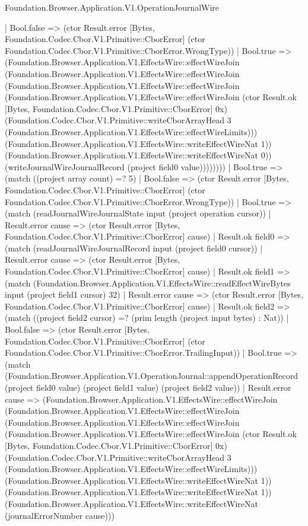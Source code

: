 \begin{lexlean}{Foundation.Browser.Application.V1.OperationJournalWire}
\begin{semanticmodule}
{                        | Bool.false => (ctor Result.error [Bytes, Foundation.Codec.Cbor.V1.Primitive::CborError] (ctor Foundation.Codec.Cbor.V1.Primitive::CborError.WrongType))
                        | Bool.true => (Foundation.Browser.Application.V1.EffectsWire::effectWireJoin (Foundation.Browser.Application.V1.EffectsWire::effectWireJoin (Foundation.Browser.Application.V1.EffectsWire::effectWireJoin (Foundation.Browser.Application.V1.EffectsWire::effectWireJoin (ctor Result.ok [Bytes, Foundation.Codec.Cbor.V1.Primitive::CborError] 0x) (Foundation.Codec.Cbor.V1.Primitive::writeCborArrayHead 3 (Foundation.Browser.Application.V1.EffectsWire::effectWireLimits))) (Foundation.Browser.Application.V1.EffectsWire::writeEffectWireNat 1)) (Foundation.Browser.Application.V1.EffectsWire::writeEffectWireNat 0)) (writeJournalWireJournalRecord (project field0 value))))))))
              | Bool.true => (match ((project array count) =? 5)
                | Bool.false => (ctor Result.error [Bytes, Foundation.Codec.Cbor.V1.Primitive::CborError] (ctor Foundation.Codec.Cbor.V1.Primitive::CborError.WrongType))
                | Bool.true => (match (readJournalWireJournalState input (project operation cursor))
                  | Result.error cause => (ctor Result.error [Bytes, Foundation.Codec.Cbor.V1.Primitive::CborError] cause)
                  | Result.ok field0 => (match (readJournalWireJournalRecord input (project field0 cursor))
                    | Result.error cause => (ctor Result.error [Bytes, Foundation.Codec.Cbor.V1.Primitive::CborError] cause)
                    | Result.ok field1 => (match (Foundation.Browser.Application.V1.EffectsWire::readEffectWireBytes input (project field1 cursor) 32)
                      | Result.error cause => (ctor Result.error [Bytes, Foundation.Codec.Cbor.V1.Primitive::CborError] cause)
                      | Result.ok field2 => (match ((project field2 cursor) =? (prim length (project input bytes) : Nat))
                        | Bool.false => (ctor Result.error [Bytes, Foundation.Codec.Cbor.V1.Primitive::CborError] (ctor Foundation.Codec.Cbor.V1.Primitive::CborError.TrailingInput))
                        | Bool.true => (match (Foundation.Browser.Application.V1.OperationJournal::appendOperationRecord (project field0 value) (project field1 value) (project field2 value))
                          | Result.error cause => (Foundation.Browser.Application.V1.EffectsWire::effectWireJoin (Foundation.Browser.Application.V1.EffectsWire::effectWireJoin (Foundation.Browser.Application.V1.EffectsWire::effectWireJoin (Foundation.Browser.Application.V1.EffectsWire::effectWireJoin (ctor Result.ok [Bytes, Foundation.Codec.Cbor.V1.Primitive::CborError] 0x) (Foundation.Codec.Cbor.V1.Primitive::writeCborArrayHead 3 (Foundation.Browser.Application.V1.EffectsWire::effectWireLimits))) (Foundation.Browser.Application.V1.EffectsWire::writeEffectWireNat 1)) (Foundation.Browser.Application.V1.EffectsWire::writeEffectWireNat 1)) (Foundation.Browser.Application.V1.EffectsWire::writeEffectWireNat (journalErrorNumber cause)))
}
\end{semanticmodule}
\end{lexlean}
